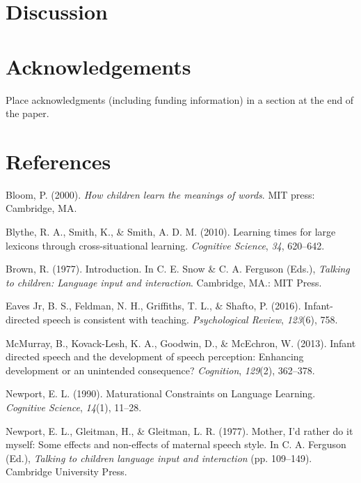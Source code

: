 \documentclass[10pt, letterpaper]{article}
\begin{document}
\section{Discussion}\label{discussion}

\section{Acknowledgements}\label{acknowledgements}

Place acknowledgments (including funding information) in a section at
the end of the paper.

\section{References}\label{references}

\setlength{\parindent}{-0.1in} \setlength{\leftskip}{0.125in} \noindent

\hypertarget{refs}{}
\hypertarget{ref-bloom2000}{}
Bloom, P. (2000). \emph{How children learn the meanings of words}. MIT
press: Cambridge, MA.

\hypertarget{ref-blythe2010}{}
Blythe, R. A., Smith, K., \& Smith, A. D. M. (2010). Learning times for
large lexicons through cross-situational learning. \emph{Cognitive
Science}, \emph{34}, 620--642.

\hypertarget{ref-brown1977}{}
Brown, R. (1977). Introduction. In C. E. Snow \& C. A. Ferguson (Eds.),
\emph{Talking to children: Language input and interaction}. Cambridge,
MA.: MIT Press.

\hypertarget{ref-eaves-jr2016}{}
Eaves Jr, B. S., Feldman, N. H., Griffiths, T. L., \& Shafto, P. (2016).
Infant-directed speech is consistent with teaching. \emph{Psychological
Review}, \emph{123}(6), 758.

\hypertarget{ref-mcmurray2013}{}
McMurray, B., Kovack-Lesh, K. A., Goodwin, D., \& McEchron, W. (2013).
Infant directed speech and the development of speech perception:
Enhancing development or an unintended consequence? \emph{Cognition},
\emph{129}(2), 362--378.

\hypertarget{ref-newport1990}{}
Newport, E. L. (1990). Maturational Constraints on Language Learning.
\emph{Cognitive Science}, \emph{14}(1), 11--28.

\hypertarget{ref-newport1977}{}
Newport, E. L., Gleitman, H., \& Gleitman, L. R. (1977). Mother, I'd
rather do it myself: Some effects and non-effects of maternal speech
style. In C. A. Ferguson (Ed.), \emph{Talking to children language input
and interaction} (pp. 109--149). Cambridge University Press.
\end{document}
